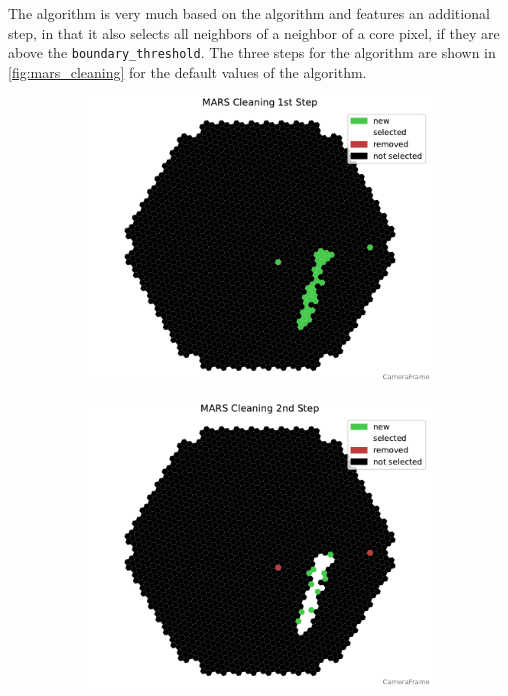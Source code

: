 The \mars{} algorithm is very much based on the \tailcuts{}
algorithm and features an additional step, in that it also selects all neighbors of a neighbor of a
core pixel, if they are above the \texttt{boundary\_threshold}. The three steps for the \mars{} algorithm
are shown in \autoref{fig:mars_cleaning} for the default values of the algorithm.

\begin{figure}
    \centering
    \begin{subfigure}[t]{0.32\textwidth}
        \includegraphics[width=\textwidth]{plots/cleaner_steps/mars_1.pdf}
    \end{subfigure}
    \hfill
    \begin{subfigure}[t]{0.32\textwidth}
        \includegraphics[width=\textwidth]{plots/cleaner_steps/mars_2.pdf}

\end{subfigure}
\end{figure}
